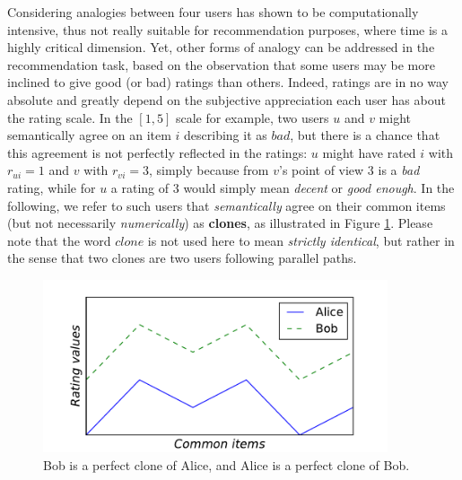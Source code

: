 Considering analogies between four users has shown to be computationally
intensive, thus not really suitable for recommendation purposes, where time is
a highly critical dimension. Yet, other forms of analogy can be addressed in
the recommendation task, based on the observation that some users may be more
inclined to give good (or bad) ratings than others. Indeed, ratings are in no
way absolute and greatly depend on the subjective appreciation each user has
about the rating scale. In the $[1, 5]$ scale for example, two users $u$ and
$v$ might semantically agree on an item $i$ describing it as $bad$, but there
is a chance that this agreement is not perfectly reflected in the ratings: $u$
might have rated $i$ with $r_{ui} = 1$ and $v$ with $r_{vi} = 3$, simply
because from $v$'s point of view $3$ is a \textit{bad} rating, while for $u$ a
rating of $3$ would simply mean \textit{decent} or \textit{good enough}.  In
the following, we refer to such users that \textit{semantically} agree on their
common items (but not necessarily \textit{numerically}) as \textbf{clones}, as
illustrated in Figure \ref{FIG:alice_and_bob_clones}. Please note that the word
$clone$ is not used here to mean \textit{strictly identical}, but rather in the
sense that two clones are two users following parallel paths.

\begin{figure}[!h]
\centering
\includegraphics[width=4in]{figures/clones.pdf}
\caption{Bob is a perfect clone of Alice, and Alice is a perfect clone of Bob.}
\label{FIG:alice_and_bob_clones}
\end{figure}

